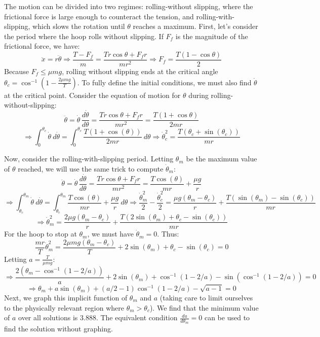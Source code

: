 \begin{solution}
The motion can be divided into two regimes: rolling-without slipping, where the frictional force is large enough to counteract the tension, and rolling-with-slipping, which slows the rotation until $\theta$ reaches a maximum. First, let's consider the period where the hoop rolls without slipping. If $F_f$ is the magnitude of the frictional force, we have:
$$\ddot{x} = r\ddot{\theta} \Longrightarrow \frac{T - F_f}{m} = \frac{Tr\cos\theta + F_f r}{mr^2}\Longrightarrow F_f = \frac{T(1-\cos\theta)}{2}$$
Because $F_f\leq\mu mg$, rolling without slipping ends at the critical angle $\displaystyle\theta_c = \cos^{-1}\left(1 - \frac{2\mu mg}{T}\right)$. To fully define the initial conditions, we must also find $\dot{\theta}$ at the critical point. Consider the equation of motion for $\theta$ during rolling-without-slipping:
$$\ddot{\theta} = \dot{\theta}\,\frac{d\dot{\theta}}{d\theta}= \frac{Tr\cos\theta + F_f r}{mr^2} = \frac{T(1+\cos\theta)}{2mr}$$
$$\Rightarrow \int_{0}^{\theta_c}\dot{\theta}\ d\dot{\theta} = \int_0^{\theta_c}\frac{T(1+\cos(\theta))}{2mr}\ d\theta\Rightarrow \dot{\theta}_c^2 = \frac{T(\theta_c +\sin(\theta_c))}{mr}$$

Now, consider the rolling-with-slipping period. Letting $\theta_m$ be the maximum value of $\theta$ reached, we will use the same trick to compute $\dot{\theta}_m$:
$$\ddot{\theta} = \dot{\theta}\,\frac{d\dot{\theta}}{d\theta}= \frac{Tr\cos\theta + F_f r}{mr^2} = \frac{T\cos(\theta)}{mr} + \frac{\mu g}{r}$$
$$\Rightarrow \int_{\theta_c}^{\theta_m}\dot{\theta}\ d\dot{\theta} = \int_{\theta_c}^{\theta_m}\frac{T\cos(\theta)}{mr} + \frac{\mu g}{r}\ d\theta\Rightarrow \frac{\dot{\theta}_{m}^2}{2} - \frac{\dot{\theta}^2_c}{2} = \frac{\mu g(\theta_m - \theta_c)}{r} + \frac{T(\sin(\theta_m) - \sin(\theta_c))}{mr}$$
$$\Rightarrow \dot{\theta}_{m}^2 =  \frac{2\mu g(\theta_m - \theta_c)}{r} + \frac{T(2\sin(\theta_m) + \theta_c-\sin(\theta_c))}{mr}$$
For the hoop to stop at $\theta_m$, we must have $\dot{\theta}_{m} = 0$. Thus:
$$\frac{mr}{T}\dot{\theta}_{m}^2 = \frac{2\mu mg(\theta_m-\theta_c)}{T} + 2\sin(\theta_m) +\theta_c - \sin(\theta_c) = 0$$
Letting $\displaystyle a = \frac{T}{\mu mg}$:
$$\Rightarrow \frac{2(\theta_m - \cos^{-1}(1 - 2/a))}{a} + 2\sin(\theta_m) + \cos^{-1}(1-2/a) - \sin(\cos^{-1}(1 - 2/a)) = 0$$
$$\Rightarrow \theta_m + a\sin(\theta_m) + (a/2 - 1)\cos^{-1}(1-2/a) - \sqrt{a-1} = 0$$
Next, we graph this implicit function of $\theta_m$ and $a$ (taking care to limit ourselves to the physically relevant region where $\theta_m > \theta_c$). We find that the minimum value of $a$ over all solutions is $\boxed{3.888}$. The equivalent condition $\displaystyle\frac{da}{d\theta_m}=0$ can be used to find the solution without graphing.
\end{solution}
